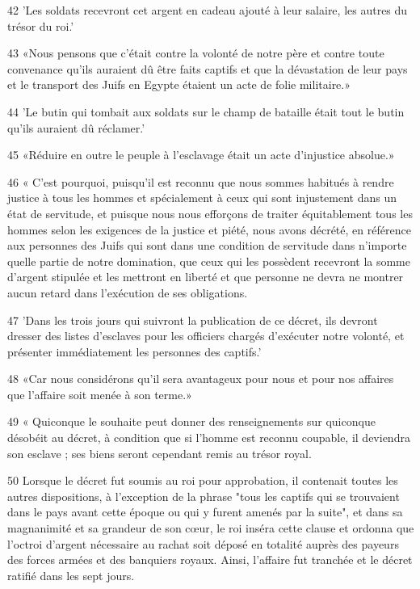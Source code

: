 \par 42 'Les soldats recevront cet argent en cadeau ajouté à leur salaire, les autres du trésor du roi.'

\par 43 «Nous pensons que c'était contre la volonté de notre père et contre toute convenance qu'ils auraient dû être faits captifs et que la dévastation de leur pays et le transport des Juifs en Egypte étaient un acte de folie militaire.»

\par 44 'Le butin qui tombait aux soldats sur le champ de bataille était tout le butin qu'ils auraient dû réclamer.'

\par 45 «Réduire en outre le peuple à l'esclavage était un acte d'injustice absolue.»

\par 46 « C'est pourquoi, puisqu'il est reconnu que nous sommes habitués à rendre justice à tous les hommes et spécialement à ceux qui sont injustement dans un état de servitude, et puisque nous nous efforçons de traiter équitablement tous les hommes selon les exigences de la justice et piété, nous avons décrété, en référence aux personnes des Juifs qui sont dans une condition de servitude dans n'importe quelle partie de notre domination, que ceux qui les possèdent recevront la somme d'argent stipulée et les mettront en liberté et que personne ne devra ne montrer aucun retard dans l'exécution de ses obligations.

\par 47 'Dans les trois jours qui suivront la publication de ce décret, ils devront dresser des listes d'esclaves pour les officiers chargés d'exécuter notre volonté, et présenter immédiatement les personnes des captifs.'

\par 48 «Car nous considérons qu'il sera avantageux pour nous et pour nos affaires que l'affaire soit menée à son terme.»

\par 49 « Quiconque le souhaite peut donner des renseignements sur quiconque désobéit au décret, à condition que si l'homme est reconnu coupable, il deviendra son esclave ; ses biens seront cependant remis au trésor royal.

\par 50 Lorsque le décret fut soumis au roi pour approbation, il contenait toutes les autres dispositions, à l'exception de la phrase "tous les captifs qui se trouvaient dans le pays avant cette époque ou qui y furent amenés par la suite", et dans sa magnanimité et sa grandeur de son cœur, le roi inséra cette clause et ordonna que l'octroi d'argent nécessaire au rachat soit déposé en totalité auprès des payeurs des forces armées et des banquiers royaux. Ainsi, l'affaire fut tranchée et le décret ratifié dans les sept jours.

